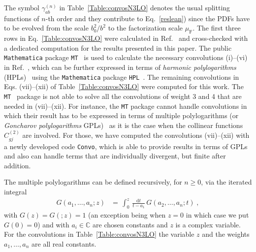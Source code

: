 \documentclass[12pt]{article}
\DeclareRobustCommand{\muf}{\ensuremath{\mu_{\mathrm{F}}}\xspace}
\DeclareRobustCommand{\muF}{\muf}
\DeclareRobustCommand{\rd}{\ensuremath{\mathrm{d}}}
\begin{document}
\begin{appendix}
The symbol $\gamma_{ab}^{(n)}$ in Table~\ref{Table:convosN3LO} denotes the usual splitting functions of $n$-th order and they contribute to Eq.~\eqref{reslean}) since the PDFs have to be evolved from the scale $b_0^2/b^2$ to the factorization scale $\muF$.
The first three rows in Eq.~\eqref{Table:convosN3LO} were calculated in Ref.~\cite{Hoeschele:2012xc} and cross-checked with a dedicated computation for the results presented in this paper. The public \texttt{Mathematica} package \texttt{MT}~\cite{Hoeschele:2013gga} is used to calculate the necessary convolutions (i)--(vi) in Ref.~\cite{Hoeschele:2012xc}, which can be further expressed in terms of \textit{harmonic polylogarithms} (HPLs)~\cite{Remiddi:1999ew} using the \texttt{Mathematica} package \texttt{HPL}~\cite{Maitre:2005uu}. 
The remaining convolutions in Eqs. (vii)--(xii) of Table~\ref{Table:convosN3LO}  were computed  for this work. The \texttt{MT}~\cite{Hoeschele:2013gga} package is not able to solve all the convolutions of weight 3 and 4 that are needed in (vii)--(xii). For instance, the \texttt{MT} package cannot handle convolutions in which their result has to be expressed in terms of multiple polylogarithms (or \emph{Goncharov polylogarithms} GPLs)~\cite{Goncharov:1998kja,Gehrmann:2000zt,Goncharov:2001iea} as it is the case when the collinear functions $C^{(2)}_{gj}$ are involved. For those, we have computed the convolutions (vii)--(xii) with a newly developed code \texttt{Convo}, which is able to provide results in terms of GPLs and also can handle terms that are individually divergent, but finite after addition.

The multiple polylogarithms can be defined recursively, for $n\geq 0$, via the iterated integral~\cite{Goncharov:1998kja,Gehrmann:2000zt,Goncharov:2001iea}
\begin{align}
   G(a_1,\ldots,a_n;z) &= \,\int_0^z\,\frac{\rd t}{t-a_1}\,G(a_2,\ldots,a_n;t) \;,
  \label{MultPolyLogdef}
\end{align}
with $G(z) = G(;z)=1$ (an exception being when $z=0$ in which case we put $G(0)=0$) and with $a_i\in \mathbb{C}$ are chosen constants and $z$ is a complex variable. For the convolutions in Table~\ref{Table:convosN3LO} the variable $z$ and the weights $a_1,\ldots,a_n$ are all real constants.


\end{appendix}
\end{document}
